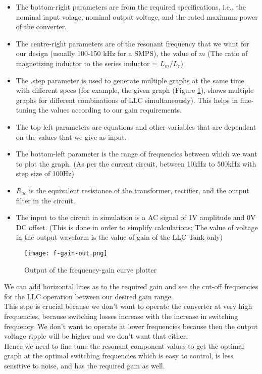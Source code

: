 \begin{itemize}
    \item The bottom-right parameters are from the required specifications, i.e., the nominal input volage, nominal output voltage, and the rated maximum power of the converter.
    \item The centre-right parameters are of the resonant frequency that we want for our design (usually 100-150 kHz for a SMPS), the value of $m$ (The ratio of magnetizing inductor to the series inductor = $L_m / L_r$)
    \item The .step parameter is used to generate multiple graphs at the same time with different specs (for example, the given graph (Figure \ref{fig:f-gain-out}), shows multiple graphs for different combinations of LLC simultaneously). This helps in fine-tuning the values according to our gain requirements.
    \item The top-left parameters are equations and other variables that are dependent on the values that we give as input.
    \item The bottom-left parameter is the range of frequencies between which we want to plot the graph. (As per the current circuit, between 10kHz to 500kHz with step size of 100Hz)
    \item $R_{ac}$ is the equivalent resistance of the transformer, rectifier, and the output filter in the circuit.
    \item The input to the circuit in simulation is a AC signal of 1V amplitude and 0V DC offset. (This is done in order to simplify calculations; The value of voltage in the output waveform is the value of gain of the LLC Tank only)
\end{itemize}
\begin{figure}[H]
    \centering
    \texttt{[image: f-gain-out.png]}
    \caption{Output of the frequency-gain curve plotter}
    \label{fig:f-gain-out}
\end{figure}
We can add horizontal lines as to the required gain and see the cut-off frequencies for the LLC operation between our desired gain range.\\
\noindent
This stpe is crucial because we don't want to operate the converter at very high frequencies, because switching losses increase with the increase in switching frequency. We don't want to operate at lower frequencies because then the output voltage ripple will be higher and we don't want that either.\\
\noindent
Hence we need to fine-tune the resonant component values to get the optimal graph at the optimal switching frequencies which is easy to control, is less sensitive to noise, and has the required gain as well.